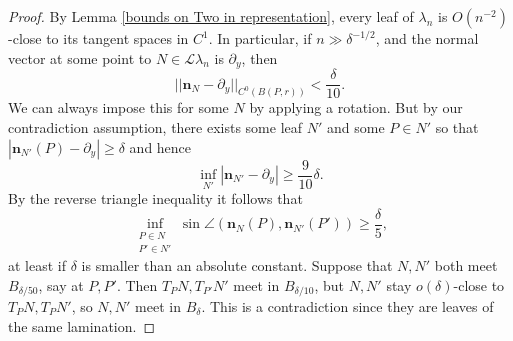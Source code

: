 \documentclass[reqno,11pt]{amsart}
\newcommand{\Leaves}{\mathscr L}
\newcommand{\normal}{\mathbf n}
\theoremstyle{definition}
\numberwithin{equation}{section}
\begin{document}
\begin{proof}
	By Lemma \ref{bounds on Two in representation}, every leaf of $\lambda_n$ is $O(n^{-2})$-close to its tangent spaces in $C^1$.
	In particular, if $n \gg \delta^{-1/2}$, and the normal vector at some point to $N \in \Leaves \lambda_n$ is $\partial_y$, then
	$$||\normal_N - \partial_y||_{C^0(B(P, r))} < \frac{\delta}{10}.$$
	We can always impose this for some $N$ by applying a rotation.
	But by our contradiction assumption, there exists some leaf $N'$ and some $P \in N'$ so that $|\normal_{N'}(P) - \partial_y| \geq \delta$ and hence
	$$\inf_{N'} |\normal_{N'} - \partial_y| \geq \frac{9}{10}\delta.$$
	By the reverse triangle inequality it follows that
	$$\inf_{\substack{P \in N\\ P' \in N'}} \sin \angle(\normal_N(P), \normal_{N'}(P')) \geq \frac{\delta}{5},$$
	at least if $\delta$ is smaller than an absolute constant.
	Suppose that $N, N'$ both meet $B_{\delta/50}$, say at $P, P'$. Then $T_PN, T_{P'} N'$ meet in $B_{\delta/10}$, but $N, N'$ stay $o(\delta)$-close to $T_PN, T_PN'$, so $N, N'$ meet in $B_\delta$. This is a contradiction since they are leaves of the same lamination.
\end{proof}
\end{document}

